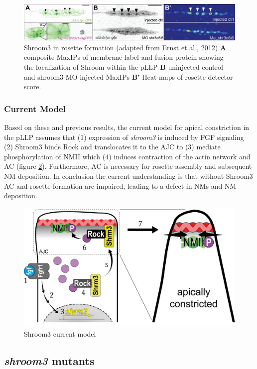 \documentclass[10pt, b5paper, singlespacinge, twoside]{reedthesis} %
\theoremstyle{definition}
\theoremstyle{definition}
\theoremstyle{definition}
\theoremstyle{remark}
\begin{document}
\begin{figure}

{\centering \includegraphics[width=0.95\linewidth]{figures/intro/shrm_ernst} 

}

\caption[Shroom3 in rosette formation]{Shroom3 in rosette formation (adapted from Ernst et al., 2012) \textbf{A} composite MaxIPs of membrane label and fusion protein showing the localization of Shroom within the pLLP \textbf{B} uninjected control and shroom3 MO injected MaxIPs \textbf{B'} Heat-maps of rosette detector score.}\label{fig:shrmernst}
\end{figure}
\hypertarget{current-model}{%
\subsubsection{Current Model}\label{current-model}}

Based on these and previous results, the current model for apical constriction in the pLLP assumes that (1) expression of \emph{shroom3} is induced by FGF signaling (2) Shroom3 binds Rock and translocates it to the AJC to (3) mediate phosphorylation of NMII which (4) induces contraction of the actin network and AC (figure \ref{fig:shrmmodel}). Furthermore, AC is necessary for rosette assembly and subsequent NM deposition. In conclusion the current understanding is that without Shroom3 AC and rosette formation are impaired, leading to a defect in NMs and NM deposition.


\begin{figure}[h]

{\centering \includegraphics[width=0.5\linewidth,]{figures/intro/shrm_model} 

}

\caption{Shroom3 current model}\label{fig:shrmmodel}
\end{figure}
\hypertarget{shroom3-mutants}{%
\subsection{\texorpdfstring{\emph{shroom3} mutants}{shroom3 mutants}}\label{shroom3-mutants}}
\end{document}
